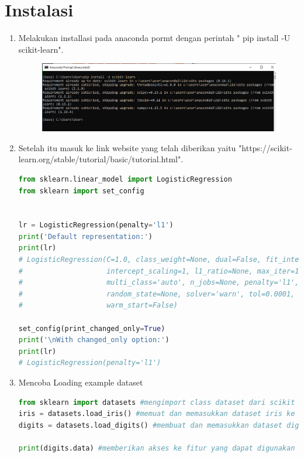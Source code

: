 \section{Instalasi}
\begin{enumerate}
\item Melakukan installasi pada anaconda pormt dengan perintah " pip install -U scikit-learn".
    \begin{figure}[!htbp]
    \centering
    \includegraphics[scale=0.4]{figures/langkah1.PNG}
    \end{figure}
    \newpage
    \item Setelah itu masuk ke link website yang telah diberikan yaitu "https://scikit-learn.org/stable/tutorial/basic/tutorial.html".
    \begin{lstlisting}[language=Python]
from sklearn.linear_model import LogisticRegression
from sklearn import set_config


lr = LogisticRegression(penalty='l1')
print('Default representation:')
print(lr)
# LogisticRegression(C=1.0, class_weight=None, dual=False, fit_intercept=True,
#                    intercept_scaling=1, l1_ratio=None, max_iter=100,
#                    multi_class='auto', n_jobs=None, penalty='l1',
#                    random_state=None, solver='warn', tol=0.0001, verbose=0,
#                    warm_start=False)

set_config(print_changed_only=True)
print('\nWith changed_only option:')
print(lr)
# LogisticRegression(penalty='l1')
\end{lstlisting}
\item Mencoba Loading example dataset
 \begin{lstlisting}[language=Python]
from sklearn import datasets #mengimport class dataset dari scikit learn library
iris = datasets.load_iris() #memuat dan memasukkan dataset iris ke variabel bernama iris
digits = datasets.load_digits() #membuat dan memasukkan dataset digits ke variabel digits

print(digits.data) #memberikan akses ke fitur yang dapat digunakan untuk mengklasifikasikan  sampel digit dan menampilkan diconsole


\end{lstlisting}
\end{enumerate}
